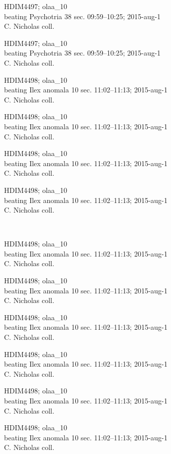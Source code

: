\documentclass[2pt]{extarticle}
\begin{document}
\noindent
\parbox{0.16\textwidth}{\tiny \raggedright \rule[-0.3\baselineskip]{0pt}{10pt}HDIM4497; olaa\_10\\ beating Psychotria 38 sec. 09:59--10:25; 2015-aug-1\\ C. Nicholas coll.}
\parbox{0.16\textwidth}{\tiny \raggedright \rule[-0.3\baselineskip]{0pt}{10pt}HDIM4497; olaa\_10\\ beating Psychotria 38 sec. 09:59--10:25; 2015-aug-1\\ C. Nicholas coll.}
\parbox{0.16\textwidth}{\tiny \raggedright \rule[-0.3\baselineskip]{0pt}{10pt}HDIM4498; olaa\_10\\ beating Ilex anomala 10 sec. 11:02--11:13; 2015-aug-1\\ C. Nicholas coll.}
\parbox{0.16\textwidth}{\tiny \raggedright \rule[-0.3\baselineskip]{0pt}{10pt}HDIM4498; olaa\_10\\ beating Ilex anomala 10 sec. 11:02--11:13; 2015-aug-1\\ C. Nicholas coll.}
\parbox{0.16\textwidth}{\tiny \raggedright \rule[-0.3\baselineskip]{0pt}{10pt}HDIM4498; olaa\_10\\ beating Ilex anomala 10 sec. 11:02--11:13; 2015-aug-1\\ C. Nicholas coll.}
\parbox{0.16\textwidth}{\tiny \raggedright \rule[-0.3\baselineskip]{0pt}{10pt}HDIM4498; olaa\_10\\ beating Ilex anomala 10 sec. 11:02--11:13; 2015-aug-1\\ C. Nicholas coll.} \\ 
\vspace{0.001in} 

\noindent
\parbox{0.16\textwidth}{\tiny \raggedright \rule[-0.3\baselineskip]{0pt}{10pt}HDIM4498; olaa\_10\\ beating Ilex anomala 10 sec. 11:02--11:13; 2015-aug-1\\ C. Nicholas coll.}
\parbox{0.16\textwidth}{\tiny \raggedright \rule[-0.3\baselineskip]{0pt}{10pt}HDIM4498; olaa\_10\\ beating Ilex anomala 10 sec. 11:02--11:13; 2015-aug-1\\ C. Nicholas coll.}
\parbox{0.16\textwidth}{\tiny \raggedright \rule[-0.3\baselineskip]{0pt}{10pt}HDIM4498; olaa\_10\\ beating Ilex anomala 10 sec. 11:02--11:13; 2015-aug-1\\ C. Nicholas coll.}
\parbox{0.16\textwidth}{\tiny \raggedright \rule[-0.3\baselineskip]{0pt}{10pt}HDIM4498; olaa\_10\\ beating Ilex anomala 10 sec. 11:02--11:13; 2015-aug-1\\ C. Nicholas coll.}
\parbox{0.16\textwidth}{\tiny \raggedright \rule[-0.3\baselineskip]{0pt}{10pt}HDIM4498; olaa\_10\\ beating Ilex anomala 10 sec. 11:02--11:13; 2015-aug-1\\ C. Nicholas coll.}
\parbox{0.16\textwidth}{\tiny \raggedright \rule[-0.3\baselineskip]{0pt}{10pt}HDIM4498; olaa\_10\\ beating Ilex anomala 10 sec. 11:02--11:13; 2015-aug-1\\ C. Nicholas coll.} \\ 
\vspace{0.001in} 
\end{document}
